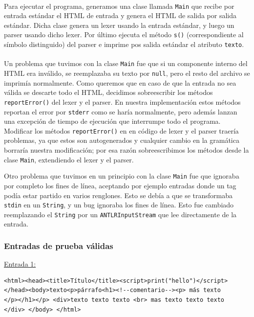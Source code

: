 \paragraph{}

Para ejecutar el programa, generamos una clase llamada \texttt{Main} que recibe por entrada estándar el HTML de entrada y genera el HTML de salida por salida estándar. Dicha clase genera un lexer usando la entrada estándar, y luego un parser usando dicho lexer. Por último ejecuta el método \texttt{s()} (correspondiente al símbolo distinguido) del parser e imprime pos salida estándar el atributo \texttt{texto}.


\paragraph{}
Un problema que tuvimos con la clase \texttt{Main} fue que si un componente interno del HTML era inválido, se reemplazaba su texto por \texttt{null}, pero el resto del archivo se imprimía normalmente. Como queremos que en caso de que la entrada no sea válida se descarte todo el HTML, decidimos sobreescribir los métodos \texttt{reportError()} del lexer y el parser. En nuestra implementación estos métodos reportan el error por \texttt{stderr} como se haría normalmente, pero además lanzan una excepción de tiempo de ejecución que interrumpe todo el programa. Modificar los métodos \texttt{reportError()} en en código de lexer y el parser traería problemas, ya que estos son autogenerados y cualquier cambio en la gramática borraría nuestra modificación; por esa razón sobreescribimos los métodos desde la clase \texttt{Main}, extendiendo el lexer y el parser.

Otro problema que tuvimos en un principio con la clase \texttt{Main} fue que ignoraba por completo los fines de línea, aceptando por ejemplo entradas donde un tag podía estar partido en varios renglones. Esto se debía a que se transformaba \texttt{stdin} en un \texttt{String}, y un bug ignoraba los fines de línea. Esto fue cambiado reemplazando el \texttt{String} por un \texttt{ANTLRInputStream} que lee directamente de la entrada.



\subsubsection{Entradas de prueba válidas}

\underline{Entrada 1:}
\begin{verbatim}
<html><head><title>Título</title><script>print("hello")</script>
</head><body>texto<p>párrafo<h1><!--comentario--><p> más texto
</p></h1></p> <div>texto texto texto <br> mas texto texto texto
</div> </body> </html>\end{verbatim}

